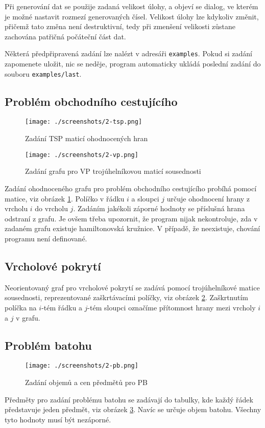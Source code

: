 \documentclass[12pt,notitlepage,fleqn]{report} %
\theoremstyle{definition}
\newcommand{\code}[1]{\texttt{#1}}
\begin{document}
Při generování dat se použije zadaná velikost úlohy, a objeví se dialog, ve kterém je možné nastavit rozmezí generovaných čísel. Velikost úlohy lze kdykoliv změnit, přičemž tato změna není destruktivní, tedy při zmenšení velikosti zůstane zachována patřičná počáteční část dat.

Některá předpřipravená zadání lze nalézt v adresáři \code{examples}. Pokud si zadání zapomenete uložit, nic se neděje, program automaticky ukládá poslední zadání do souboru \code{examples/last}.

\subsection{Problém obchodního cestujícího}
\begin{figure}[h]
 \centering
 \texttt{[image: ./screenshots/2-tsp.png]}
 \caption{Zadání TSP maticí ohodnocených hran}
 \label{fig:gui-2-tsp}
\end{figure}
\begin{figure}[!]
 \centering
 \texttt{[image: ./screenshots/2-vp.png]}
 \caption{Zadání grafu pro VP trojúhelníkovou maticí sousednosti}
 \label{fig:gui-2-vp}
\end{figure}
Zadání ohodnoceného grafu pro problém obchodního cestujícího probíhá pomocí matice, viz obrázek \ref{fig:gui-2-tsp}. Políčko v řádku $i$ a sloupci $j$ určuje ohodnocení hrany z vrcholu $i$ do vrcholu $j$. Zadáním jakékoli záporné hodnoty se příslušná hrana odstraní z grafu. Je ovšem třeba upozornit, že program nijak nekontroluje, zda v zadaném grafu existuje hamiltonovská kružnice. V případě, že neexistuje, chování programu není definované.

\subsection{Vrcholové pokrytí}
Neorientovaný graf pro vrcholové pokrytí se zadává pomocí trojúhelníkové matice sousednosti, reprezentované zaškrtávacími políčky, viz obrázek \ref{fig:gui-2-vp}. Zaškrtnutím políčka na $i$-tém řádku a $j$-tém sloupci označíme přítomnost hrany mezi vrcholy $i$ a $j$ v grafu.

\subsection{Problém batohu}
\begin{figure}[h]
 \centering
 \texttt{[image: ./screenshots/2-pb.png]}
 \caption{Zadání objemů a cen předmětů pro PB}
 \label{fig:gui-2-pb}
\end{figure}
\eject
Předměty pro zadání problému batohu se zadávají do tabulky, kde každý řádek představuje jeden předmět, viz obrázek \ref{fig:gui-2-pb}. Navíc se určuje objem batohu. Všechny tyto hodnoty musí být nezáporné.
\end{document}
